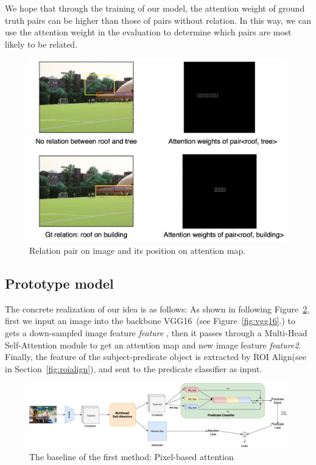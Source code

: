 We hope that through the training of our model, the attention weight of ground truth pairs can be higher than those of pairs without relation. In this way, we can use the attention weight in the evaluation to determine which pairs are most likely to be related.
\begin{figure}[!htbp]
	\centering
	\includegraphics[width=0.9\linewidth]{figures/idea_method1}
	\caption[An example of Pixel-based attention]{Relation pair on image and its position on attention map.}
	\label{fig:ideamethod1}
\end{figure}

\subsection{ Prototype model}
The concrete realization of our idea is as follows: As shown in following Figure~\ref{fig:method1baseline}, first we input an image into the  backbone VGG16~\cite{simonyan2015deep}(see Figure~\ref{fig:vgg16}.) to gets a down-sampled image feature \textit{feature} ,  then it passes through a Multi-Head Self-Attention module to get an attention map and new image feature \textit{feature2}. Finally, the feature of the subject-predicate object is extracted by ROI Align(see in Section~\ref{fig:roialign}), and sent to the predicate classifier as input.


\begin{figure}[!htbp]
	\centering
	\includegraphics[width=1.1\linewidth]{figures/method1_baseline}
	\caption[The baseline of the first method: Pixel-based attention]{The baseline of the  first method: Pixel-based attention}
	\label{fig:method1baseline}
\end{figure}


